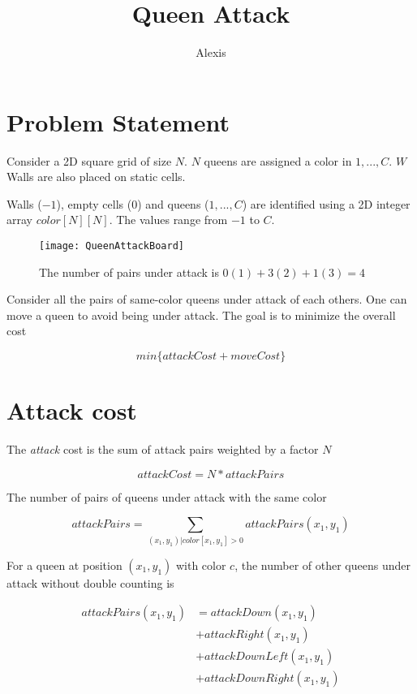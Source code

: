 \documentclass{article} %
\author{Alexis}
\title{Queen Attack} %
\begin{document}
  \maketitle

  \section{Problem Statement}

  Consider a 2D square grid of size $N$. $N$ queens are assigned a color in $1, ..., C$. $W$ Walls are also placed on static cells.

  Walls ($-1$), empty cells ($0$) and queens ($1, ..., C$) are identified using a 2D integer array $color[N][N]$. The values range from $-1$ to $C$.

  \begin{figure}[h]
    \centering
    \texttt{[image: QueenAttackBoard]}
    \caption{The number of pairs under attack is $0 (1) + 3 (2) + 1 (3) = 4$}
    \label{fig:QueenAttackBoard}
  \end{figure}

  Consider all the pairs of same-color queens under attack of each others. One can move a queen to avoid being under attack. The goal is to minimize the overall cost

  \[ min \{ attackCost + moveCost \} \]

  \section{Attack cost}

  The \textit{attack} cost is the sum of attack pairs weighted by a factor $N$

  \[ attackCost = N * attackPairs \]

  The number of pairs of queens under attack with the same color

  \[ attackPairs = \sum_{(x_1, y_1) | color[x_1, y_1] > 0} attackPairs(x_1, y_1) \]

  For a queen at position $(x_1, y_1)$ with color $c$, the number of other queens under attack without double counting is

  \begin{align*}
      attackPairs(x_1, y_1) & = attackDown(x_1, y_1) \\
                               & + attackRight(x_1, y_1) \\
                               & + attackDownLeft(x_1, y_1) \\
                               & + attackDownRight(x_1, y_1)
  \end{align*}
\end{document}
